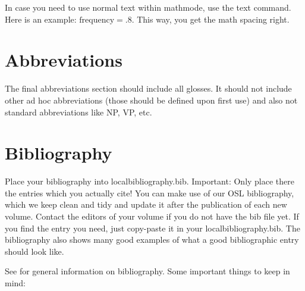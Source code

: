 In case you need to use normal text within mathmode, use the text command. Here is an example: $\text{frequency}=.8$. This way, you get the math spacing right.

\section{Abbreviations}

The final abbreviations section should include all glosses. It should not include other ad hoc abbreviations (those should be defined upon first use) and also not standard abbreviations like NP, VP, etc.


\section{Bibliography}

Place your bibliography into localbibliography.bib. Important: Only place there the entries which you actually cite! You can make use of our OSL bibliography, which we keep clean and tidy and update it after the publication of each new volume. Contact the editors of your volume if you do not have the bib file yet. If you find the entry you need, just copy-paste it in your localbibliography.bib. The bibliography also shows many good examples of what a good bibliographic entry should look like.

See \citet{Nordhoff.Muller2021} for general information on bibliography. Some important things to keep in mind:

